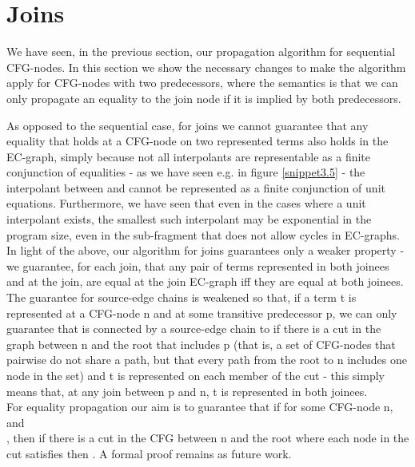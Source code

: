 \newpage
\section{Joins}\label{section:ugfole:joins}
We have seen, in the previous section, our propagation algorithm for sequential CFG-nodes.
In this section we show the necessary changes to make the algorithm apply for CFG-nodes with two predecessors, where the semantics is that we can only propagate an equality to the join node if it is implied by both predecessors.

As opposed to the sequential case, for joins we cannot guarantee that any equality that holds at a CFG-node on two represented terms also holds in the EC-graph, simply because not all interpolants are representable as a finite conjunction of equalities - as we have seen e.g. in figure \ref{snippet3.5} - the interpolant between  and  cannot be represented as a finite conjunction of unit equations. 
Furthermore, we have seen that even in the cases where a unit interpolant exists, the smallest such interpolant may be exponential in the program size, even in the sub-fragment that does not allow cycles in EC-graphs. In light of the above, our algorithm for joins guarantees only a weaker property - we guarantee, for each join, that any pair of terms represented in both joinees and at the join, are equal at the join EC-graph iff they are equal at both joinees. 
The guarantee for source-edge chains is weakened so that, if a term t is represented at a CFG-node n and at some transitive predecessor p, we can only guarantee that  is connected by a source-edge chain to  if there is a cut in the graph between n and the root that includes p (that is, a set of CFG-nodes that pairwise do not share a path, but that every path from the root to n includes one node in the set) and t is represented on each member of the cut - this simply means that, at any join between p and n, t is represented in both joinees.\\
For equality propagation our aim is to guarantee that if
 for some CFG-node n, and\\ , then if there is a cut in the CFG between n and the root where each node  in the cut satisfies  then . A formal proof remains as future work.

